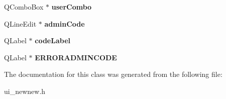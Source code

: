 \begin{DoxyCompactItemize}
Q\+Combo\+Box $\ast$ {\bfseries user\+Combo}
\item 
\mbox{\label{class_ui__newnew_a97a89aa3853e66320a6589dcc2b83dba}} 
Q\+Line\+Edit $\ast$ {\bfseries admin\+Code}
\item 
\mbox{\label{class_ui__newnew_af470042deee74a435ca20d2e492b8dbb}} 
Q\+Label $\ast$ {\bfseries code\+Label}
\item 
\mbox{\label{class_ui__newnew_a089c24248904c815077d88eb74be977a}} 
Q\+Label $\ast$ {\bfseries E\+R\+R\+O\+R\+A\+D\+M\+I\+N\+C\+O\+DE}
\end{DoxyCompactItemize}


The documentation for this class was generated from the following file\+:\begin{DoxyCompactItemize}
\item 
ui\+\_\+newnew.\+h\end{DoxyCompactItemize}
